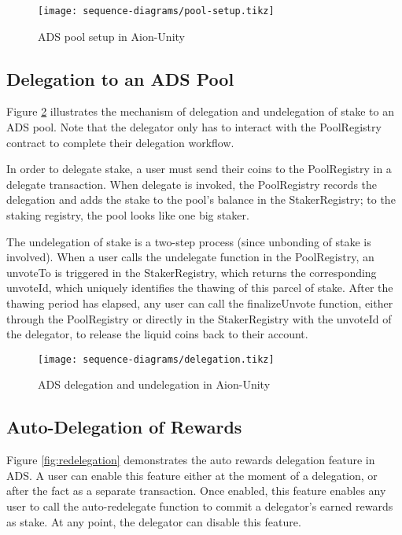 \begin{figure}[ht]
\centering
\texttt{[image: sequence-diagrams/pool-setup.tikz]}
\caption{ADS pool setup in Aion-Unity}
\label{fig:pool_setup}
\end{figure}
\clearpage

\subsection{Delegation to an ADS Pool}

Figure \ref{fig:delegation} illustrates the mechanism of delegation and undelegation of stake to an ADS pool. Note that the delegator only has to interact with the PoolRegistry contract to complete their delegation workflow. 

In order to delegate stake, a user must send their coins to the PoolRegistry in a delegate transaction. When delegate is invoked, the PoolRegistry records the delegation and adds the stake to the pool's balance in the StakerRegistry; to the staking registry, the pool looks like one big staker. 

The undelegation of stake is a two-step process (since unbonding of stake is involved). When a user calls the undelegate function in the PoolRegistry, an unvoteTo is triggered in the StakerRegistry, which returns the corresponding unvoteId, which uniquely identifies the thawing of this parcel of stake. After the thawing period has elapsed, any user can call the finalizeUnvote function, either through the PoolRegistry or directly in the StakerRegistry with the unvoteId of the delegator, to release the liquid coins back to their account. 

\begin{figure}[ht]
\centering
\texttt{[image: sequence-diagrams/delegation.tikz]}
\caption{ADS delegation and undelegation in Aion-Unity}
\label{fig:delegation}
\end{figure}
\clearpage

\subsection{Auto-Delegation of Rewards}

Figure \ref{fig:redelegation} demonstrates the  auto rewards delegation feature in ADS. A user can enable this feature either at the moment of a delegation, or after the fact as a separate transaction. Once enabled, this feature enables any user to call the auto-redelegate function to commit a delegator's earned rewards as stake. At any point, the delegator can disable this feature. 

